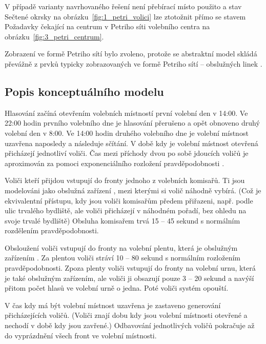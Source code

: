 \documentclass[12pt,a4paper,titlepage,final]{article}
\begin{document}
V případě varianty navrhovaného řešení není přebírací místo použito a stav Sečtené okrsky na obrázku~\ref{fig:1_petri_volici} lze ztotožnit přímo se stavem Požadavky čekající na centrum v Petriho síti volebního centra na obrázku~\ref{fig:3_petri_centrum}.

Zobrazení ve formě Petriho sítí bylo zvoleno, protože se abstraktní model skládá převážně z prvků typicky zobrazovaných ve formě Petriho sítí -- obslužných linek \cite[str. 163]{ims}.

\subsection{Popis konceptuálního modelu}

Hlasování začíná otevřením volebních místností první volební den v 14:00. Ve 22:00 hodin prvního volebního dne je hlasování přerušeno a opět obnoveno druhý volební den v 8:00. Ve 14:00 hodin druhého volebního dne je volební místnost uzavřena naposledy a následuje sčítání. V době kdy je volební místnost otevřená přicházejí jednotliví voliči. Čas mezi příchody dvou po sobě jdoucích voličů je aproximován za pomoci exponenciálního rozložení pravděpodobnosti \cite[str. 91]{ims}.

Voliči kteří přijdou vstupují do fronty jednoho z volebních komisařů. Ti jsou modelováni jako obslužná zařízení \cite[str. 180]{ims}, mezi kterými si volič náhodně vybírá. (Což je ekvivalentní přístupu, kdy jsou voliči komisařům předem přiřazeni, např. podle ulic trvalého bydliště, ale voliči přicházejí v náhodném pořadí, bez ohledu na svoje trvalé bydliště) Obsluha komisařem trvá 15 -- 45 sekund s normálním rozdělením pravděpodobnosti.

Obsloužení voliči vstupují do fronty na volební plentu, která je obslužným zařízením \cite[str. 180]{ims}. Za plentou voliči stráví 10 -- 80 sekund s normálním rozložením pravděpodobnosti. Zpoza plenty voliči vstupují do fronty na volební urnu, která je také obslužným zařízením, ale voliči ji obsazují pouze 3 -- 20 sekund a navýší přitom počet hlasů ve volební urně o jedna. Poté voliči systém opouští.

V čas kdy má být volební místnost uzavřena je zastaveno generování přicházejících voličů. (Voliči znají dobu kdy jsou volební místnosti otevřené a nechodí v době kdy jsou zavřené.) Odbavování jednotlivých voličů pokračuje až do vyprázdnění všech front ve volební místnosti.
\end{document}
